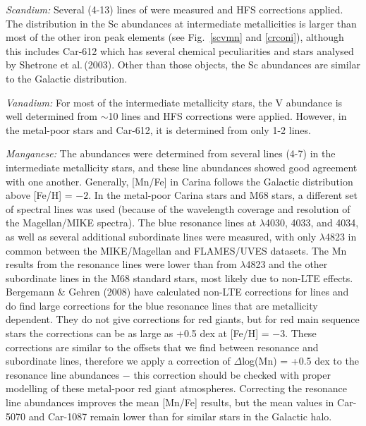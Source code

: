 \documentclass{emulateapj}
\newcommand\etal{{\rm et al.\,}}
\begin{document}
{\it Scandium:} Several (4-13) lines of  were 
measured and HFS corrections applied.   The distribution 
in the Sc abundances at intermediate metallicities is larger 
than most of the other iron peak elements 
(see Fig.~\ref{scvmn} and \ref{crconi}), 
although this includes Car-612 which has several chemical 
peculiarities and stars analysed by Shetrone \etal (2003).   
Other than those objects, the Sc abundances are similar
to the Galactic distribution.

{\it Vanadium:} For most of the intermediate metallicity stars,
the V abundance is well determined from $\sim$10  lines
and HFS corrections were applied.  However, in the metal-poor stars 
and Car-612, it is determined from only 1-2 lines.  

{\it Manganese:} The  abundances were determined from 
several lines (4-7) in the intermediate metallicity stars, and 
these line abundances showed good agreement with one another.   
Generally, [Mn/Fe] in Carina follows the Galactic distribution
above [Fe/H] = $-2$.   In the metal-poor Carina stars and M68 
stars, a different set of spectral lines was used (because
of the wavelength coverage and resolution of the Magellan/MIKE 
spectra).  The blue resonance lines at $\lambda$4030, 4033, and 
4034, as well as several additional subordinate lines were measured, 
with only   $\lambda$4823 in common between the MIKE/Magellan and 
FLAMES/UVES datasets.   The Mn results from the resonance lines 
were lower than from $\lambda$4823 and the other subordinate lines
in the M68 standard stars, most likely due to non-LTE effects.
Bergemann \& Gehren (2008) have calculated non-LTE corrections 
for  lines and do find large corrections for the blue 
resonance lines that are metallicity dependent.   They do not
give corrections for red giants, but for red main sequence stars
the corrections can be as large as +0.5 dex at [Fe/H] = $-3$.   
These corrections are similar to the offsets that we find between 
resonance and subordinate lines, therefore we apply a correction
of $\Delta$log(Mn) = +0.5 dex to the  resonance line
abundances $-$ this correction should be checked with proper modelling
of these metal-poor red giant atmospheres.   Correcting the resonance 
line abundances improves the mean [Mn/Fe] results, but the mean
values in Car-5070 and Car-1087 remain lower than for similar 
stars in the Galactic halo.

\end{document}
